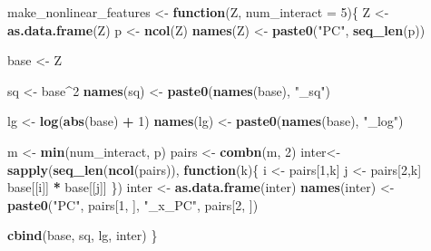\documentclass[
]{article}
\newenvironment{Shaded}{\begin{snugshade}}{\end{snugshade}}
\newcommand{\AttributeTok}[1]{\textcolor[rgb]{0.13,0.29,0.53}{#1}}
\newcommand{\ControlFlowTok}[1]{\textcolor[rgb]{0.13,0.29,0.53}{\textbf{#1}}}
\newcommand{\DecValTok}[1]{\textcolor[rgb]{0.00,0.00,0.81}{#1}}
\newcommand{\FunctionTok}[1]{\textcolor[rgb]{0.13,0.29,0.53}{\textbf{#1}}}
\newcommand{\NormalTok}[1]{#1}
\newcommand{\OtherTok}[1]{\textcolor[rgb]{0.56,0.35,0.01}{#1}}
\newcommand{\SpecialCharTok}[1]{\textcolor[rgb]{0.81,0.36,0.00}{\textbf{#1}}}
\newcommand{\StringTok}[1]{\textcolor[rgb]{0.31,0.60,0.02}{#1}}
\begin{document}
\begin{Shaded}
\begin{Highlighting}[]
\NormalTok{make\_nonlinear\_features }\OtherTok{\textless{}{-}} \ControlFlowTok{function}\NormalTok{(Z, }\AttributeTok{num\_interact =} \DecValTok{5}\NormalTok{)\{}
\NormalTok{  Z }\OtherTok{\textless{}{-}} \FunctionTok{as.data.frame}\NormalTok{(Z)}
\NormalTok{  p }\OtherTok{\textless{}{-}} \FunctionTok{ncol}\NormalTok{(Z)}
  \FunctionTok{names}\NormalTok{(Z) }\OtherTok{\textless{}{-}} \FunctionTok{paste0}\NormalTok{(}\StringTok{"PC"}\NormalTok{, }\FunctionTok{seq\_len}\NormalTok{(p))}
  
\NormalTok{  base }\OtherTok{\textless{}{-}}\NormalTok{ Z}
  
\NormalTok{  sq }\OtherTok{\textless{}{-}}\NormalTok{ base}\SpecialCharTok{\^{}}\DecValTok{2}
  \FunctionTok{names}\NormalTok{(sq) }\OtherTok{\textless{}{-}} \FunctionTok{paste0}\NormalTok{(}\FunctionTok{names}\NormalTok{(base), }\StringTok{"\_sq"}\NormalTok{)}
  
\NormalTok{  lg }\OtherTok{\textless{}{-}} \FunctionTok{log}\NormalTok{(}\FunctionTok{abs}\NormalTok{(base) }\SpecialCharTok{+} \DecValTok{1}\NormalTok{)}
  \FunctionTok{names}\NormalTok{(lg) }\OtherTok{\textless{}{-}} \FunctionTok{paste0}\NormalTok{(}\FunctionTok{names}\NormalTok{(base), }\StringTok{"\_log"}\NormalTok{)}
  
\NormalTok{  m }\OtherTok{\textless{}{-}} \FunctionTok{min}\NormalTok{(num\_interact, p)}
\NormalTok{  pairs }\OtherTok{\textless{}{-}} \FunctionTok{combn}\NormalTok{(m, }\DecValTok{2}\NormalTok{)}
\NormalTok{  inter}\OtherTok{\textless{}{-}} \FunctionTok{sapply}\NormalTok{(}\FunctionTok{seq\_len}\NormalTok{(}\FunctionTok{ncol}\NormalTok{(pairs)), }\ControlFlowTok{function}\NormalTok{(k)\{}
\NormalTok{    i }\OtherTok{\textless{}{-}}\NormalTok{ pairs[}\DecValTok{1}\NormalTok{,k]}
\NormalTok{    j }\OtherTok{\textless{}{-}}\NormalTok{ pairs[}\DecValTok{2}\NormalTok{,k]}
\NormalTok{    base[[i]] }\SpecialCharTok{*}\NormalTok{ base[[j]]}
\NormalTok{  \})}
\NormalTok{  inter }\OtherTok{\textless{}{-}} \FunctionTok{as.data.frame}\NormalTok{(inter)}
  \FunctionTok{names}\NormalTok{(inter) }\OtherTok{\textless{}{-}} \FunctionTok{paste0}\NormalTok{(}\StringTok{"PC"}\NormalTok{, pairs[}\DecValTok{1}\NormalTok{, ], }\StringTok{"\_x\_PC"}\NormalTok{, pairs[}\DecValTok{2}\NormalTok{, ])}
  
  \FunctionTok{cbind}\NormalTok{(base, sq, lg, inter)}
\NormalTok{\}}
\end{Highlighting}
\end{Shaded}
\end{document}
